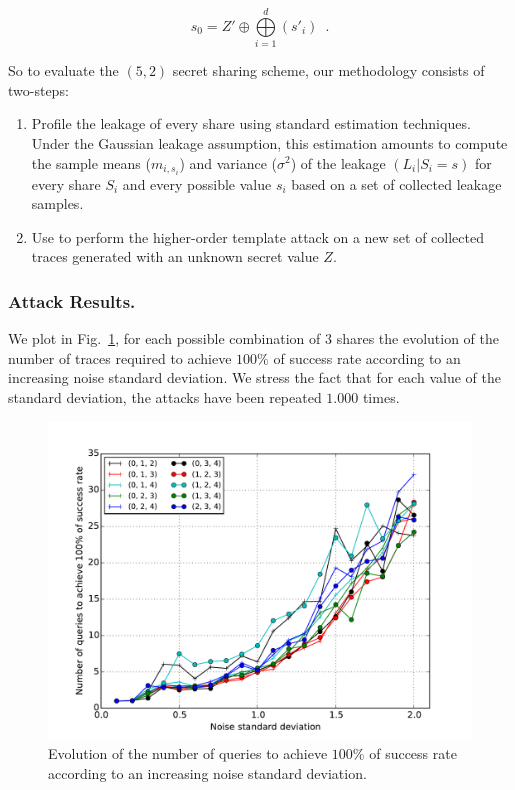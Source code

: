 \documentclass{llncs}
\begin{document}
\begin{equation*}
s_0= Z' \oplus \bigoplus\limits_{i=1}^{d} (s'_i) \enspace.
\end{equation*}

So to evaluate the $(5,2)$ secret sharing scheme, our methodology consists of two-steps:

\begin{enumerate}
\item Profile the leakage of every share using standard estimation techniques. Under the Gaussian leakage assumption, this estimation amounts to compute the sample means ($m_{i,s_i}$) and variance ($\sigma^2$) of the leakage $(L_i | S_i = s)$ for every share $S_i$ and every possible value $s_i$ based on a set of collected leakage samples.
\item Use \label{eq_pdf} to perform the higher-order template attack on a new set of collected traces generated with an unknown secret value $Z$.
\end{enumerate} 

\subsubsection{Attack Results.} 

We plot in Fig.~\ref{fig_3_shares}, for each possible combination of $3$ shares the evolution of the number of traces required to achieve $100\%$ of success rate according to an increasing noise standard deviation. We stress the fact that for each value of the standard deviation, the attacks have been repeated $1.000$ times.  

\begin{figure}
\begin{center}
\includegraphics[width=1\textwidth]{Figure/res_125_246_119_104_150.pdf}
\caption{Evolution of the number of queries to achieve $100\%$ of success rate according to an increasing noise standard deviation.}
\label{fig_3_shares}
\end{center}
\end{figure}
\end{document}
